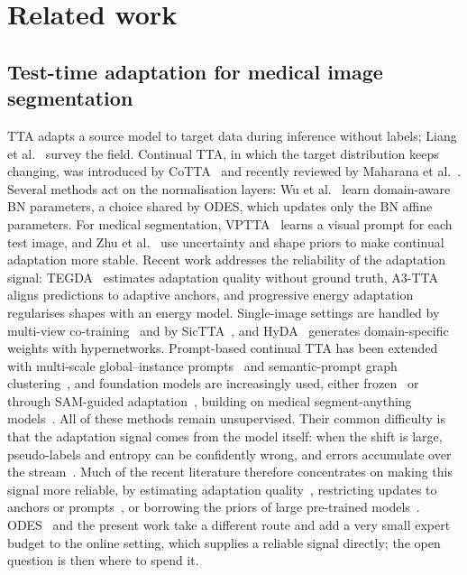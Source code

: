 \documentclass[a4paper,fleqn]{cas-dc}
\begin{document}
\section{Related work}
\subsection{Test-time adaptation for medical image segmentation}
TTA adapts a source model to target data during inference without labels; Liang et al.~\cite{liang2025survey} survey the field. Continual TTA, in which the target distribution keeps changing, was introduced by CoTTA~\cite{wang2022cotta} and recently reviewed by Maharana et al.~\cite{maharana2026cttasurvey}. Several methods act on the normalisation layers: Wu et al.~\cite{wu2024dabn} learn domain-aware BN parameters, a choice shared by ODES, which updates only the BN affine parameters. For medical segmentation, VPTTA~\cite{chen2024vptta} learns a visual prompt for each test image, and Zhu et al.~\cite{zhu2025uncertainty} use uncertainty and shape priors to make continual adaptation more stable. Recent work addresses the reliability of the adaptation signal: TEGDA~\cite{zhou2025tegda} estimates adaptation quality without ground truth, A3-TTA~\cite{wu2026a3tta} aligns predictions to adaptive anchors, and progressive energy adaptation~\cite{zhang2025energy} regularises shapes with an energy model. Single-image settings are handled by multi-view co-training~\cite{joshi2025single} and by SicTTA~\cite{wu2026sictta}, and HyDA~\cite{serebro2025hyda} generates domain-specific weights with hypernetworks. Prompt-based continual TTA has been extended with multi-scale global--instance prompts~\cite{li2025mgipt} and semantic-prompt graph clustering~\cite{du2026spegc}, and foundation models are increasingly used, either frozen~\cite{ji2026redifm} or through SAM-guided adaptation~\cite{wu2025samtta,xu2025batta}, building on medical segment-anything models~\cite{ma2024medsam}. All of these methods remain unsupervised. Their common difficulty is that the adaptation signal comes from the model itself: when the shift is large, pseudo-labels and entropy can be confidently wrong, and errors accumulate over the stream~\cite{wang2022cotta,maharana2026cttasurvey}. Much of the recent literature therefore concentrates on making this signal more reliable, by estimating adaptation quality~\cite{zhou2025tegda}, restricting updates to anchors or prompts~\cite{wu2026a3tta,chen2024vptta}, or borrowing the priors of large pre-trained models~\cite{ji2026redifm,wu2025samtta}. ODES~\cite{islam2025odes} and the present work take a different route and add a very small expert budget to the online setting, which supplies a reliable signal directly; the open question is then where to spend it.
\end{document}
